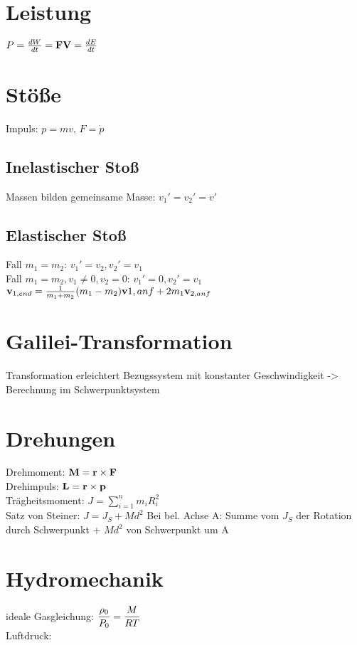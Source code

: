 \documentclass[fs, footer]{latex4ei}
\begin{document}
\begin{multicols*}{4}
\section{Leistung}
$P = \frac{dW}{dt} = \textbf{F}\textbf{V} = \frac{dE}{dt}$\\

\section{Stöße}
Impuls: $p = mv$, $F=\dot p$\\
\subsection{Inelastischer Stoß}
Massen bilden gemeinsame Masse: $v_1' = v_2' = v'$\\
\subsection{Elastischer Stoß}
Fall $m_1 = m_2$: $v_1' = v_2, v_2' = v_1$\\
Fall $m_1 = m_2, v_1 \neq 0, v_2 = 0$: $v_1' = 0, v_2' = v_1$\\
$\textbf{v}_{1,end} = \frac{1}{m_1+m_2}{(m_1-m_2)\textbf{v}{1,anf} + 2m_1\textbf{v}_{2,anf}}$\\


\section{Galilei-Transformation}
Transformation erleichtert Bezugssystem mit konstanter Geschwindigkeit
-> Berechnung im Schwerpunktsystem

\section{Drehungen}
Drehmoment: $\textbf{M} = \textbf{r} \times \textbf{F}$\\
Drehimpuls: $\textbf{L} = \textbf{r} \times \textbf{p}$\\
Trägheitsmoment: $J = \sum_{i=1}^n m_iR_i^2$\\
Satz von Steiner: $J = J_S + Md^2$ Bei bel. Achse A: Summe vom $J_S$ der Rotation durch Schwerpunkt + $Md^2$ von Schwerpunkt um A\\



\section{Hydromechanik}
ideale Gasgleichung: $ \dfrac{\rho _0}{P_0} = \dfrac{M}{RT}$\\
Luftdruck:



	
\end{multicols*}
\end{document}
